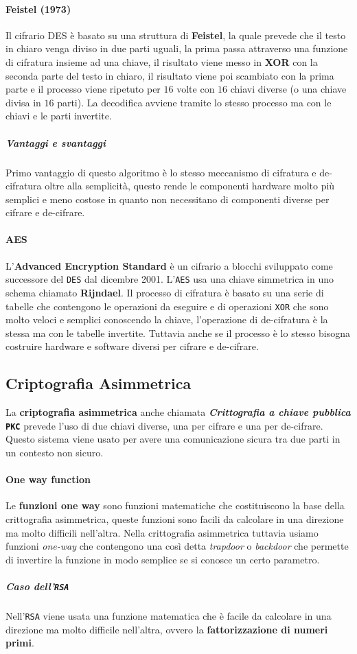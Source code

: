             \paragraph{Feistel (1973)}
                Il cifrario DES è basato su una struttura di \textbf{Feistel}, la quale prevede che il testo in chiaro venga diviso in due parti uguali, la prima passa attraverso una funzione di cifratura insieme ad una chiave, il risultato viene messo in \textbf{XOR} con la seconda parte del testo in chiaro, il risultato viene poi scambiato con la prima parte e il processo viene ripetuto per $16$ volte con $16$ chiavi diverse (o una chiave divisa in $16$ parti). La decodifica avviene tramite lo stesso processo ma con le chiavi e le parti invertite.
                \subparagraph{Vantaggi e svantaggi} Primo vantaggio di questo algoritmo è lo stesso meccanismo di cifratura e de-cifratura oltre alla semplicità, questo rende le componenti hardware molto più semplici e meno costose in quanto non necessitano di componenti diverse per cifrare e de-cifrare. 
            \paragraph{AES} \label{par:AES}
                L'\textbf{Advanced Encryption Standard} è un cifrario a blocchi sviluppato come successore del \texttt{DES} dal dicembre 2001. L'\texttt{AES} usa una chiave simmetrica in uno schema chiamato \textbf{Rijndael}.\newline
                Il processo di cifratura è basato su una serie di tabelle che contengono le operazioni da eseguire e di operazioni \texttt{XOR} che sono molto veloci e semplici conoscendo la chiave, l'operazione di de-cifratura è la stessa ma con le tabelle invertite. Tuttavia anche se il processo è lo stesso bisogna costruire hardware e software diversi per cifrare e de-cifrare.
    \subsection{Criptografia Asimmetrica}
        La \textbf{criptografia asimmetrica} anche chiamata \textbf{\textit{Crittografia a chiave pubblica}} \textbf{\texttt{PKC}} prevede l'uso di due chiavi diverse, una per cifrare e una per de-cifrare. Questo sistema viene usato per avere una comunicazione sicura tra due parti in un contesto non sicuro.
        \paragraph{One way function} Le \textbf{funzioni one way} sono funzioni matematiche che costituiscono la base della crittografia asimmetrica, queste funzioni sono facili da calcolare in una direzione ma molto difficili nell'altra. Nella crittografia asimmetrica tuttavia usiamo funzioni \textit{one-way} che contengono una così detta \textit{trapdoor} o \textit{backdoor} che permette di invertire la funzione in modo semplice se si conosce un certo parametro.
        \subparagraph{Caso dell'\texttt{RSA}}
            Nell'\texttt{RSA} viene usata una funzione matematica che è facile da calcolare in una direzione ma molto difficile nell'altra, ovvero la \textbf{fattorizzazione di numeri primi}.
